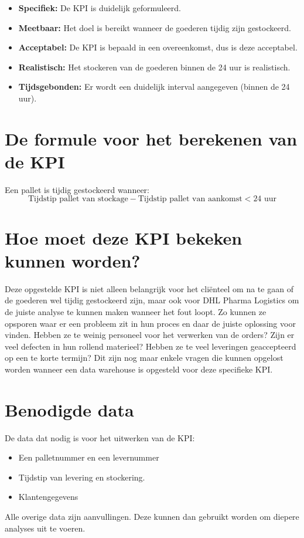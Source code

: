 \begin{itemize}
	\item \textbf{Specifiek: } De KPI is duidelijk geformuleerd.
	\item \textbf{Meetbaar: } Het doel is bereikt wanneer de goederen tijdig zijn gestockeerd.
	\item \textbf{Acceptabel:} De KPI is bepaald in een overeenkomst, dus is deze acceptabel.
	\item \textbf{Realistisch: } Het stockeren van de goederen binnen de 24 uur is realistisch.
	\item \textbf{Tijdsgebonden: } Er wordt een duidelijk interval aangegeven (binnen de 24 uur).
\end{itemize} 

\section{De formule voor het berekenen van de KPI}
Een pallet is tijdig gestockeerd wanneer:
\begin{equation*}
	\text{Tijdstip pallet van stockage} - \text{Tijdstip pallet van aankomst} < \text{24 uur}
\end{equation*}

\section{Hoe moet deze KPI bekeken kunnen worden?}
Deze opgestelde KPI is niet alleen belangrijk voor het cliënteel om na te gaan of de goederen wel tijdig gestockeerd zijn, maar ook voor DHL Pharma Logistics om de juiste analyse te kunnen maken wanneer het fout loopt. Zo kunnen ze opsporen waar er een probleem zit in hun proces en daar de juiste oplossing voor vinden. Hebben ze te weinig personeel voor het verwerken van de orders? Zijn er veel defecten in hun rollend materieel? Hebben ze te veel leveringen geaccepteerd op een te korte termijn? Dit zijn nog maar enkele vragen die kunnen opgelost worden wanneer een data warehouse is opgesteld voor deze specifieke KPI.

\section{Benodigde data}
De data dat nodig is voor het uitwerken van de KPI:
\begin{itemize}
	\item Een palletnummer en een levernummer
	\item Tijdstip van levering en stockering.
	\item Klantengegevens
\end{itemize} 

Alle overige data zijn aanvullingen. Deze kunnen dan gebruikt worden om diepere analyses uit te voeren.